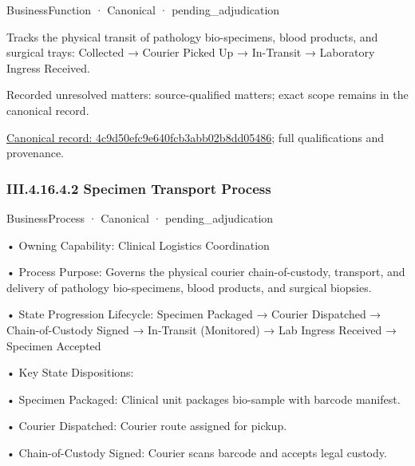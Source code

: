 \label{element:4c9d50efc9e640fcb3abb02b8dd05486}
{\small BusinessFunction · Canonical · pending\_adjudication}\par

Tracks the physical transit of pathology bio-specimens, blood products, and surgical trays: Collected → Courier Picked Up → In-Transit → Laboratory Ingress Received.


{\small Recorded unresolved matters: source-qualified matters; exact scope remains in the canonical record.}\par
{\footnotesize \href{../../../../../../../../continuum/business/business-function/4c9d50efc9e640fcb3abb02b8dd05486.md}{Canonical record: 4c9d50efc9e640fcb3abb02b8dd05486}; full qualifications and provenance.}\par
\subsubsection*{III.4.16.4.2 Specimen Transport Process}
\label{navigation:III.4.16.4.2}

\label{element:11bb000294fc44a8af295f4682e2fe6c}
{\small BusinessProcess · Canonical · pending\_adjudication}\par

•
Owning Capability: Clinical Logistics Coordination



•
Process Purpose: Governs the physical courier chain-of-custody, transport, and delivery of pathology bio-specimens, blood products, and surgical biopsies.



•
State Progression Lifecycle: Specimen Packaged → Courier Dispatched → Chain-of-Custody Signed → In-Transit (Monitored) → Lab Ingress Received → Specimen Accepted



•
Key State Dispositions:



•
Specimen Packaged: Clinical unit packages bio-sample with barcode manifest.



•
Courier Dispatched: Courier route assigned for pickup.



•
Chain-of-Custody Signed: Courier scans barcode and accepts legal custody.



